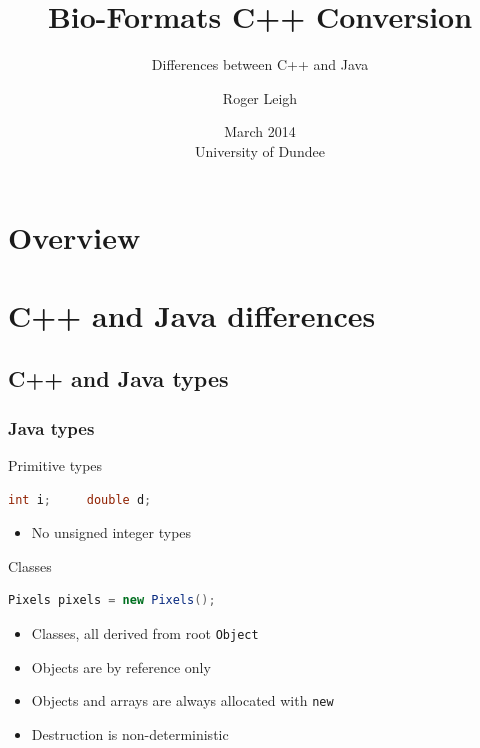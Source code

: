 \documentclass[handout]{beamer}
\title{Bio-Formats C++ Conversion}
\subtitle{Differences between C++ and Java}
\author{Roger Leigh}
\date{March 2014\\University of Dundee}
\begin{document}
\begin{frame}[plain]
  \titlepage
  \begin{center}
     \hfill
    \hfill
  \end{center}
\end{frame}

\section*{Overview}

\section{C++ and Java differences}
\subsection{C++ and Java types}

\begin{frame}[fragile]
  \frametitle{Java types}

  \begin{block}{Primitive types}
    \begin{lstlisting}[language=Java]
int i;     double d;
\end{lstlisting}
    \begin{itemize}
      \pause
    \item No unsigned integer types
    \end{itemize}
  \end{block}
  \pause
  \begin{block}{Classes}
    \begin{lstlisting}[language=Java]
Pixels pixels = new Pixels();
\end{lstlisting}
    \begin{itemize}
      \pause
    \item Classes, all derived from root \texttt{Object}
      \pause
    \item Objects are by reference only
      \pause
    \item Objects and arrays are always allocated with \texttt{new}
      \pause
    \item Destruction is non-deterministic
    \end{itemize}
  \end{block}
\end{frame}
\end{document}
